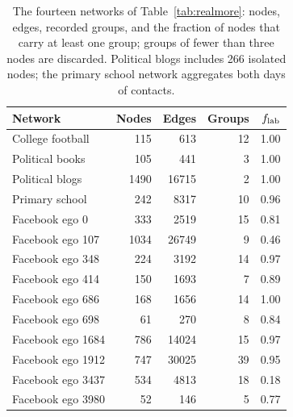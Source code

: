 \begin{table}[h]
\caption{The fourteen networks of Table~\ref{tab:realmore}: nodes, edges, recorded groups, and the fraction of nodes that carry at least one group; groups of fewer than three nodes are discarded. Political blogs includes 266 isolated nodes; the primary school network aggregates both days of contacts.}
\label{tab:datamore}
\begin{ruledtabular}
\begin{tabular}{lrrrr}
Network & Nodes & Edges & Groups & $f_{\rm lab}$ \\
\hline
College football & 115 & 613 & 12 & 1.00 \\
Political books & 105 & 441 & 3 & 1.00 \\
Political blogs & 1490 & 16715 & 2 & 1.00 \\
Primary school & 242 & 8317 & 10 & 0.96 \\
Facebook ego 0 & 333 & 2519 & 15 & 0.81 \\
Facebook ego 107 & 1034 & 26749 & 9 & 0.46 \\
Facebook ego 348 & 224 & 3192 & 14 & 0.97 \\
Facebook ego 414 & 150 & 1693 & 7 & 0.89 \\
Facebook ego 686 & 168 & 1656 & 14 & 1.00 \\
Facebook ego 698 & 61 & 270 & 8 & 0.84 \\
Facebook ego 1684 & 786 & 14024 & 15 & 0.97 \\
Facebook ego 1912 & 747 & 30025 & 39 & 0.95 \\
Facebook ego 3437 & 534 & 4813 & 18 & 0.18 \\
Facebook ego 3980 & 52 & 146 & 5 & 0.77 \\
\end{tabular}
\end{ruledtabular}
\end{table}
